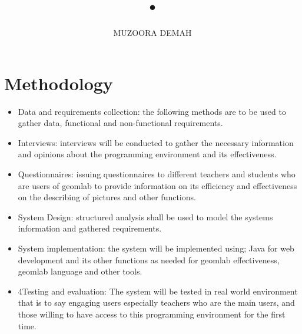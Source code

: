 \documentclass[10pt]{article}
\begin{document}
\title{•}
\author{MUZOORA DEMAH}

\maketitle
\section{Methodology}
\begin{itemize}
\item Data and requirements collection: the following methods are to be used to gather data, functional and non-functional requirements.
\item    Interviews: interviews will be conducted to gather the necessary information and opinions about the programming environment and its effectiveness.
\item Questionnaires: issuing questionnaires to different teachers and students who are users of geomlab to provide information on its efficiency and effectiveness on the describing of pictures and other functions.
\item System Design: structured analysis shall be used to model the systems information and gathered requirements. 
\item System implementation: the system will be implemented using; Java for web development and its other functions as needed for geomlab effectiveness, geomlab language and other tools.
\item 4Testing and evaluation: The system will be tested in real world environment that is to say engaging users especially teachers who are the main users, and those willing to have access to this programming environment for the first time.
\end{itemize}
\end{document}
